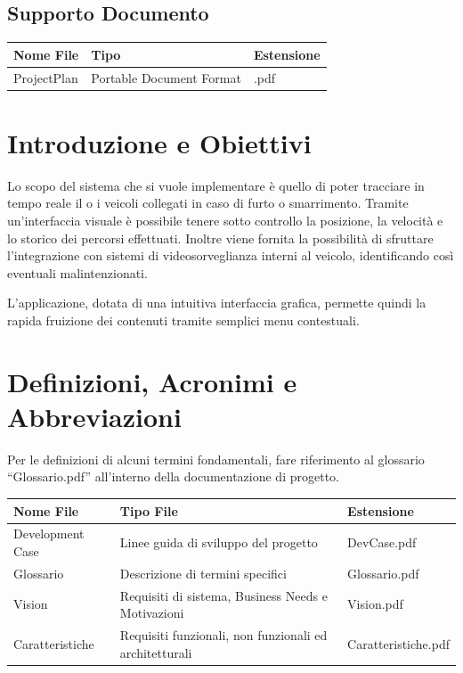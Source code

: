 \documentclass[a4paper,12pt]{article}
\begin{document}
\subsection{Supporto Documento}
\begin{table}[ht]
\begin{center}
\begin{tabular}{p{6cm} p{5cm} p{2cm}}
\rowcolor{Ash}
\hline
Nome File & Tipo & Estensione \\ \hline
ProjectPlan & Portable Document Format & .pdf \\ \hline
\end{tabular}
\end{center}
\end{table}

\clearpage

\pagebreak

\section{Introduzione e Obiettivi}

Lo scopo del sistema che si vuole implementare è quello di poter tracciare in tempo reale il o i veicoli collegati in caso di furto o smarrimento. Tramite un'interfaccia visuale è possibile tenere sotto controllo la posizione, la velocità e lo storico dei percorsi effettuati. Inoltre viene fornita la possibilità di sfruttare l'integrazione con sistemi di videosorveglianza interni al veicolo, identificando così eventuali malintenzionati. 

L'applicazione, dotata di una intuitiva interfaccia grafica, permette quindi la rapida fruizione dei contenuti tramite semplici menu contestuali.


\section{Definizioni, Acronimi e Abbreviazioni}

Per le definizioni di alcuni termini fondamentali, fare riferimento al glossario ``Glossario.pdf'' all'interno della documentazione di progetto.

\begin{table}[h]
\begin{center}
\begin{tabular}{ p{4.5cm} p{4.5cm} p{3.5cm} } 
\rowcolor{Ash}	
\hline	
Nome File & Tipo File & Estensione  \\ \hline
Development Case & Linee guida di sviluppo del progetto & DevCase.pdf  \\ 
Glossario & Descrizione di termini specifici & Glossario.pdf  \\ 
Vision & Requisiti di sistema, Business Needs e Motivazioni & Vision.pdf  \\ 
Caratteristiche & Requisiti funzionali, non funzionali ed architetturali & Caratteristiche.pdf  \\ \hline
\end{tabular}
\end{center}
\end{table}
\end{document}
